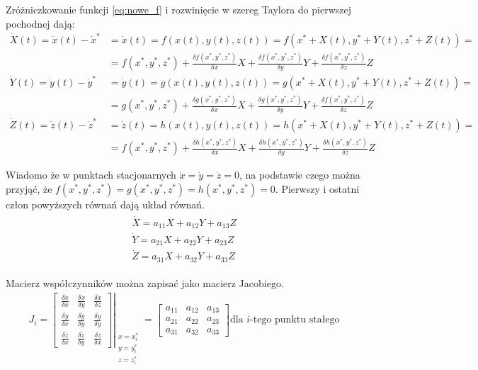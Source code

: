 Zróżniczkowanie funkcji \ref{eq:nowe_f} i rozwinięcie w szereg Taylora do pierwszej pochodnej dają:
\begin{align}
\dot{X}(t)=\dot{x}(t)-\dot{x}^* &=\dot{x}(t)=f(x(t),y(t),z(t))=f(x^*+X(t),y^*+Y(t),z^*+Z(t))= \nonumber\\
&=f(x^*,y^*,z^*)+\frac{\delta f(x^*,y^*,z^*)}{\delta x}X+\frac{\delta f(x^*,y^*,z^*)}{\delta y}Y+\frac{\delta f(x^*,y^*,z^*)}{\delta z}Z \nonumber\\
\dot{Y}(t)=\dot{y}(t)-\dot{y}^* &=\dot{y}(t)=g(x(t),y(t),z(t))=g(x^*+X(t),y^*+Y(t),z^*+Z(t))=\\
&=g(x^*,y^*,z^*)+\frac{\delta g(x^*,y^*,z^*)}{\delta x}X+\frac{\delta g(x^*,y^*,z^*)}{\delta y}Y+\frac{\delta f(x^*,y^*,z^*)}{\delta z}Z \nonumber\\
\dot{Z}(t)=\dot{z}(t)-\dot{z}^* &=\dot{z}(t)=h(x(t),y(t),z(t))=h(x^*+X(t),y^*+Y(t),z^*+Z(t))=\nonumber\\
&=f(x^*,y^*,z^*)+\frac{\delta h(x^*,y^*,z^*)}{\delta x}X+\frac{\delta h(x^*,y^*,z^*)}{\delta y}Y+\frac{\delta h(x^*,y^*,z^*)}{\delta z}Z\nonumber
\end{align}

Wiadomo że w punktach stacjonarnych $\dot{x}= \dot{y} =\dot{z} =0$, na podstawie czego można przyjąć, że $f(x^*,y^*,z^*)=g(x^*,y^*,z^*)=h(x^*,y^*,z^*)=0$. Pierwszy i ostatni człon powyższych równań dają układ równań.
\begin{align}
\begin{array}{c}
\dot{X}=a_{11}X+a_{12}Y+a_{13}Z \\
\dot{Y}=a_{21}X+a_{22}Y+a_{23}Z \\
\dot{Z}=a_{31}X+a_{32}Y+a_{33}Z
\end{array}
\end{align}

Macierz współczynników można zapisać jako macierz Jacobiego.
\begin{align*}
J_i= \left. \left[
\begin{array}{ccc}
\frac{\delta \dot{x}}{\delta x} & \frac{\delta \dot{x}}{\delta y} & \frac{\delta \dot{x}}{\delta z} \\
\frac{\delta \dot{y}}{\delta x} & \frac{\delta \dot{y}}{\delta y} & \frac{\delta \dot{y}}{\delta y} \\
\frac{\delta \dot{z}}{\delta x} & \frac{\delta \dot{z}}{\delta y} & \frac{\delta \dot{z}}{\delta x}
\end{array}
\right]
\right|_{
	\begin{array}{c}
		x=x^*_i\\
		y=y^*_i\\
		z=z^*_i	
	\end{array}	
}
= \left[
\begin{array}{ccc}
a_{11} & a_{12} & a_{13} \\
a_{21} & a_{22} & a_{23} \\
a_{31} & a_{32} & a_{33}
\end{array}
\right] \text{dla }i\text{-tego punktu stałego}
\end{align*}

